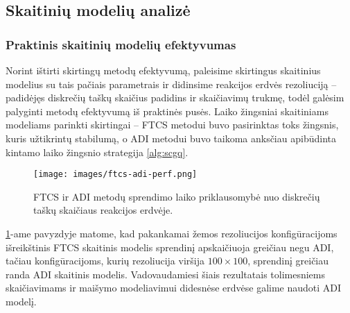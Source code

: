\subsection{Skaitinių modelių analizė}


\subsubsection*{Praktinis skaitinių modelių efektyvumas}

Norint ištirti skirtingų metodų efektyvumą, paleisime skirtingus skaitinius modelius su tais pačiais parametrais ir didinsime reakcijos erdvės rezoliuciją -- padidėjęs diskrečių taškų skaičius padidins ir skaičiavimų trukmę, todėl galėsim palyginti metodų efektyvumą iš praktinės pusės. Laiko žingsniai skaitiniams modeliams parinkti skirtingai -- FTCS metodui buvo pasirinktas toks žingsnis, kuris užtikrintų stabilumą, o ADI metodui buvo taikoma anksčiau apibūdinta kintamo laiko žingsnio strategija \eqref{alg:scgq}.

\begin{figure}[h!]
  \centering
  \texttt{[image: images/ftcs-adi-perf.png]}
  \caption{FTCS ir ADI metodų sprendimo laiko priklausomybė nuo diskrečių taškų skaičiaus reakcijos erdvėje.}
  \label{fig:adi-ftcs-solve-time-comparison}
\end{figure}

\ref{fig:adi-ftcs-solve-time-comparison}-ame pavyzdyje matome, kad pakankamai žemos rezoliucijos konfigūracijoms išreikštinis FTCS skaitinis modelis sprendinį apskaičiuoja greičiau negu ADI, tačiau konfigūracijoms, kurių rezoliucija viršija $100\times100$, sprendinį greičiau randa ADI skaitinis modelis. Vadovaudamiesi šiais rezultatais tolimesniems skaičiavimams ir maišymo modeliavimui didesnėse erdvėse galime naudoti ADI modelį.
